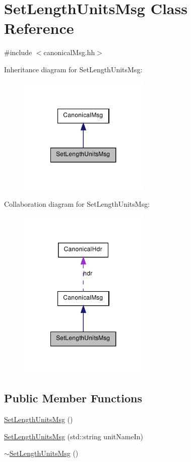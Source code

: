 \hypertarget{class_set_length_units_msg}{
\section{SetLengthUnitsMsg Class Reference}
\label{class_set_length_units_msg}
}


{\ttfamily \#include $<$canonicalMsg.hh$>$}



Inheritance diagram for SetLengthUnitsMsg:\nopagebreak
\begin{figure}[H]
\begin{center}
\leavevmode
\includegraphics[width=176pt]{class_set_length_units_msg__inherit__graph}
\end{center}
\end{figure}


Collaboration diagram for SetLengthUnitsMsg:\nopagebreak
\begin{figure}[H]
\begin{center}
\leavevmode
\includegraphics[width=176pt]{class_set_length_units_msg__coll__graph}
\end{center}
\end{figure}
\subsection*{Public Member Functions}
\begin{DoxyCompactItemize}
\item 
\hyperlink{class_set_length_units_msg_a8b55bc59aaa42567628f1f1264abc94c}{SetLengthUnitsMsg} ()
\item 
\hyperlink{class_set_length_units_msg_acec37e34a297a3b11adb4df5fc000ee8}{SetLengthUnitsMsg} (std::string unitNameIn)
\item 
\hyperlink{class_set_length_units_msg_a247028e4113677e488db916091e0dc1c}{$\sim$SetLengthUnitsMsg} ()
\end{DoxyCompactItemize}

